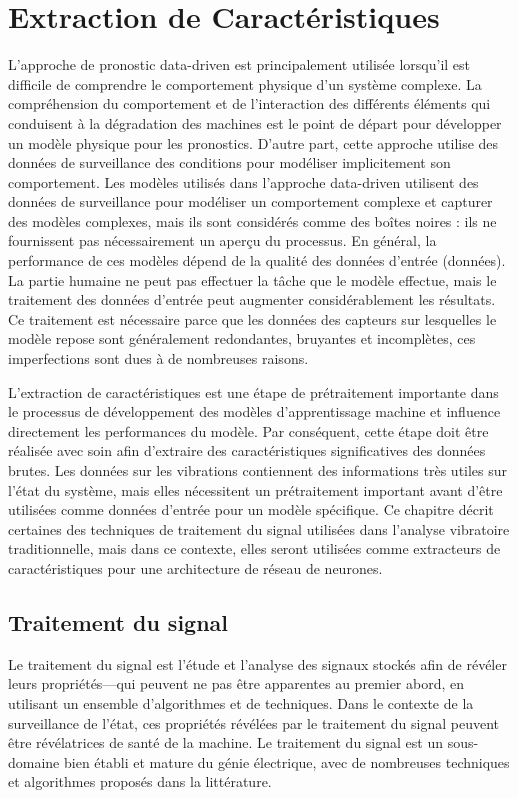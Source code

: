 \section{Extraction de Caractéristiques}
L'approche de pronostic data-driven est principalement utilisée lorsqu'il est difficile de comprendre le comportement physique d'un système complexe. La compréhension du comportement et de l'interaction des différents éléments qui conduisent à la dégradation des machines est le point de départ pour développer un modèle physique pour les pronostics.
D'autre part, cette approche utilise des données de surveillance des conditions pour modéliser implicitement son comportement. Les modèles utilisés dans l'approche data-driven utilisent des données de surveillance pour modéliser un comportement complexe et capturer des modèles complexes, mais ils sont considérés comme des boîtes noires : ils ne fournissent pas nécessairement un aperçu du processus.
En général, la performance de ces modèles dépend de la qualité des données d'entrée (données). La partie humaine ne peut pas effectuer la tâche que le modèle effectue, mais le traitement des données d'entrée peut augmenter considérablement les résultats. Ce traitement est nécessaire parce que les données des capteurs sur lesquelles le modèle repose sont généralement redondantes, bruyantes et incomplètes, ces imperfections sont dues à de nombreuses raisons.

L'extraction de caractéristiques est une étape de prétraitement importante dans le processus de développement des modèles d'apprentissage machine et influence directement les performances du modèle. Par conséquent, cette étape doit être réalisée avec soin afin d'extraire des caractéristiques significatives des données brutes. Les données sur les vibrations contiennent des informations très utiles sur l'état du système, mais elles nécessitent un prétraitement important avant d'être utilisées comme données d'entrée pour un modèle spécifique. Ce chapitre décrit certaines des techniques de traitement du signal utilisées dans l'analyse vibratoire traditionnelle, mais dans ce contexte, elles seront utilisées comme extracteurs de caractéristiques pour une architecture de réseau de neurones.

\subsection{Traitement du signal}
Le traitement du signal est l'étude et l'analyse des signaux stockés afin de révéler leurs propriétés—qui peuvent ne pas être apparentes au premier abord, en utilisant un ensemble d'algorithmes et de techniques. Dans le contexte de la surveillance de l'état, ces propriétés révélées par le traitement du signal peuvent être révélatrices de santé de la machine.
Le traitement du signal est un sous-domaine bien établi et mature du génie électrique, avec de nombreuses techniques et algorithmes proposés dans la littérature.


